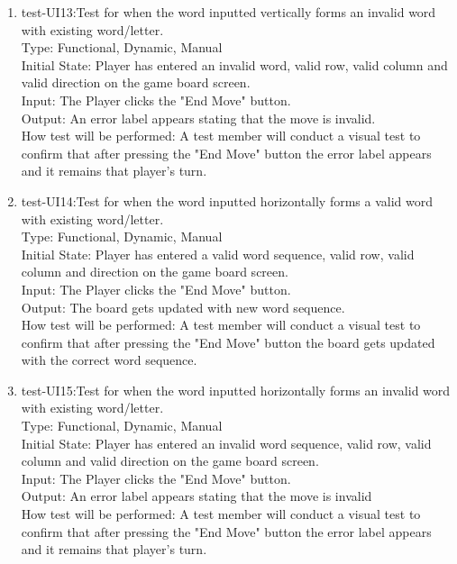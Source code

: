 \documentclass[12pt, titlepage]{article}
\begin{document}
\begin{enumerate}
    \item{test-UI13:Test for when the word inputted vertically forms an invalid word with existing word/letter.\\} %
    Type: Functional, Dynamic, Manual\\
    Initial State: Player has entered an invalid word, valid row, valid column and valid direction on the game board screen.\\
    Input: The Player clicks the "End Move" button.\\
    Output: An error label appears stating that the move is invalid.\\
    How test will be performed: A test member will conduct a visual test to confirm that after pressing the "End Move" button the error label appears and it remains that player's turn.\\
    
    \item{test-UI14:Test for when the word inputted horizontally forms a valid word with existing word/letter.\\} %
    Type: Functional, Dynamic, Manual\\
    Initial State: Player has entered a valid word sequence, valid row, valid column and direction on the game board screen.\\
    Input: The Player clicks the "End Move" button.\\
    Output: The board gets updated with new word sequence. \\
    How test will be performed: A test member will conduct a visual test to confirm that after pressing the "End Move" button the board gets updated with the correct word sequence.\\
    
    \item{test-UI15:Test for when the word inputted horizontally forms an invalid word with existing word/letter.\\} %
    Type: Functional, Dynamic, Manual\\
    Initial State: Player has entered an invalid word sequence, valid row, valid column and valid direction on the game board screen.\\
    Input: The Player clicks the "End Move" button.\\
    Output: An error label appears stating that the move is invalid \\
    How test will be performed: A test member will conduct a visual test to confirm that after pressing the "End Move" button the error label appears and it remains that player's turn.\\
    

\end{enumerate}
\end{document}
